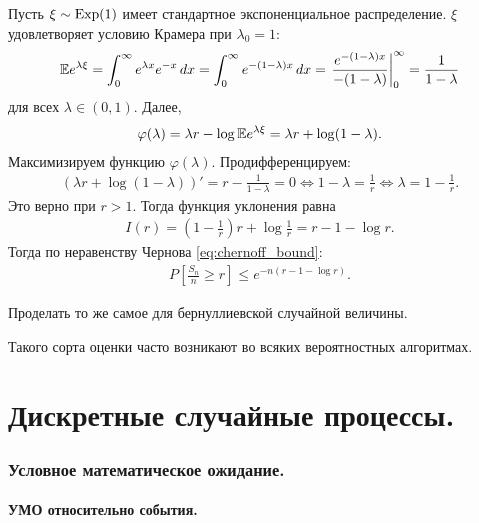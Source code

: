 \documentclass[../main.tex]{subfiles}
\begin{document}
\begin{exmpl}
 Пусть $ \xi \sim \mathrm{Exp}(1) $ имеет стандартное экспоненциальное распределение. $ \xi $ удовлетворяет условию Крамера при  $ \lambda_0 = 1 $:
 \begin{align*}
  \mathbb E e^{\lambda \xi} = \int_{0}^{\infty} e^{\lambda x}e^{-x}\,dx = \int_{0}^{\infty} e^{-(1 - \lambda)x}\,dx = \left. \frac{e^{-(1-\lambda)x}}{-(1-\lambda)} \right|_0^{\infty} = \frac{1}{1 - \lambda}
  \end{align*} для всех $ \lambda \in (0,1) $. Далее,
  \begin{align*}
   \varphi(\lambda) = \lambda r - \log \mathbb E e^{\lambda \xi} = \lambda r + \log(1 - \lambda).
  \end{align*} Максимизируем функцию $ \varphi(\lambda) $. Продифференцируем:
  \begin{align*}
   (\lambda r + \log(1 - \lambda))' = r - \frac{1}{1 - \lambda} = 0 \iff 1 - \lambda = \frac{1}{r} \iff \lambda = 1 - \frac{1}{r}.
  \end{align*} Это верно при $ r > 1 $. Тогда функция уклонения равна
  \begin{align*}
   I(r) = \left(1 - \frac{1}{r}\right)r + \log \frac{1}r = r - 1 - \log r.
  \end{align*} Тогда по неравенству Чернова \eqref{eq:chernoff_bound}:
  \begin{align*}
   P \left[ \frac{S_n}{n} \geqslant r \right] \leqslant e^{-n(r - 1 - \log r)}.
  \end{align*}
 \end{exmpl}

 \begin{exercs*}
  Проделать то же самое для бернуллиевской случайной величины.
 \end{exercs*}

 Такого сорта оценки часто возникают во всяких вероятностных алгоритмах.

 \newpage

 \part{Дискретные случайные процессы.}

 \section{Условное математическое ожидание.}

 \subsection{УМО относительно события.}
\end{document}
